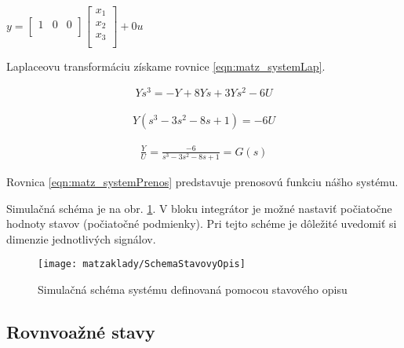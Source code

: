 \documentclass[../main.tex]{subfiles}
\begin{document}
        \begin{center}
		$y  = 
		\begin{bmatrix} 
			1 & 0 & 0 \\ 
		\end{bmatrix} 
		\begin{bmatrix} 
			x_1 \\ 
			x_2 \\ 
			x_3 \\ 
		\end{bmatrix} +
		0u $
	\label{eqn:matz_system2}
        \end{center}

Laplaceovu transformáciu získame rovnice \ref{eqn:matz_systemLap}. 

\begin{equation}
	\begin{split}
		Ys^3 = -Y + 8 Ys + 3Ys^2 - 6U
	\end{split}
	\label{eqn:matz_systemLap}
\end{equation}

\begin{equation}
	\begin{split}
		Y(s^3 -3s^2 -8s + 1) = - 6U
	\end{split}
\end{equation}

\begin{equation}
	\begin{split}
		\frac{Y}{U} = \frac{-6}{s^3 -3s^2 -8s + 1} = G(s)
	\end{split}
	\label{eqn:matz_systemPrenos}
\end{equation}

Rovnica  \ref{eqn:matz_systemPrenos} predstavuje prenosovú funkciu nášho systému.

Simulačná schéma je na obr. \ref{fig:matz_systemStavovyOpisSimulink}. V bloku integrátor je možné nastaviť počiatočne hodnoty stavov (počiatočné podmienky). Pri tejto schéme je dôležité uvedomiť si dimenzie jednotlivých signálov.

\begin{figure}[h!]
	\centering
	\texttt{[image: matzaklady/SchemaStavovyOpis]}
	\caption{Simulačná schéma systému definovaná pomocou stavového opisu}
	\label{fig:matz_systemStavovyOpisSimulink}
\end{figure}

\subsection{Rovnvoažné stavy}
\end{document}
